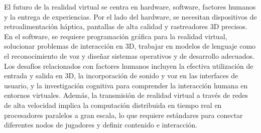 El futuro de la realidad virtual se centra en hardware, software, factores humanos y la entrega de experiencias. Por el lado del hardware, se necesitan dispositivos de retroalimentación háptica, pantallas de alta calidad y rastreadores 3D precisos. En el software, se requiere programación gráfica para la realidad virtual, solucionar problemas de interacción en 3D, trabajar en modelos de lenguaje como el reconocimiento de voz y diseñar sistemas operativos y de desarrollo adecuados. Los desafíos relacionados con factores humanos incluyen la efectiva utilización de entrada y salida en 3D, la incorporación de sonido y voz en las interfaces de usuario, y la investigación cognitiva para comprender la interacción humana en entornos virtuales. Además, la transmisión de realidad virtual a través de redes de alta velocidad implica la computación distribuida en tiempo real en procesadores paralelos a gran escala, lo que requiere estándares para conectar diferentes nodos de jugadores y definir contenido e interacción. \parencite{zheng1998virtual}
